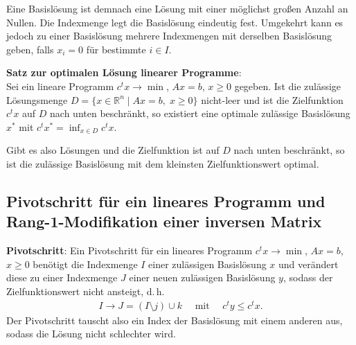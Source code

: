 Eine Basislösung ist demnach eine Lösung mit einer möglichst großen Anzahl
an Nullen.
Die Indexmenge legt die Basislösung eindeutig fest.
Umgekehrt kann es jedoch zu einer Basislösung mehrere Indexmengen mit derselben
Basislösung geben, falls $x_i = 0$ für bestimmte $i \in I$.

\linie

\textbf{Satz zur optimalen Lösung linearer Programme}: \\
Sei ein lineare Programm $c^t x \rightarrow \min$, $Ax = b$, $x \ge 0$
gegeben.
Ist die zulässige Lösungsmenge
$D = \{x \in \mathbb{R}^n \;|\; Ax = b,\; x \ge 0\}$
nicht-leer und ist die Zielfunktion $c^t x$ auf $D$ nach unten beschränkt,
so existiert eine optimale zulässige Basislösung $x^\ast$ mit
$c^t x^\ast = \inf_{x \in D} c^t x$.

Gibt es also Lösungen und die Zielfunktion ist auf $D$ nach unten beschränkt,
so ist die zulässige Basislösung mit dem kleinsten Zielfunktionswert optimal.

\pagebreak

\subsection{%
    Pivotschritt für ein lineares Programm und Rang-1-Modifikation einer
    inversen Matrix%
}

\textbf{Pivotschritt}:
Ein Pivotschritt für ein lineares Programm $c^t x \rightarrow \min$,
$Ax = b$, $x \ge 0$ benötigt die Indexmenge $I$ einer zulässigen Basislösung
$x$ und verändert diese zu einer Indexmenge $J$ einer neuen zulässigen
Basislösung $y$, sodass der Zielfunktionswert nicht ansteigt, d.\,h.
\begin{align*}
    I \rightarrow J = (I \setminus j) \cup k \quad\text{ mit }\quad
    c^t y \le c^t x.
\end{align*}
Der Pivotschritt tauscht also ein Index der Basislösung mit einem anderen aus,
sodass die Lösung nicht schlechter wird.

